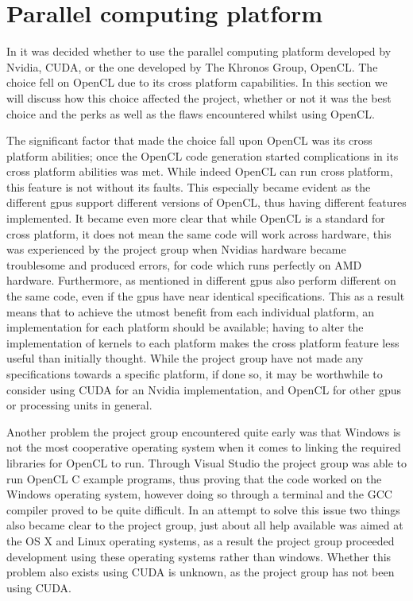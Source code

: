 \section{Parallel computing platform}
In  it was decided whether to use the parallel computing platform developed by Nvidia, CUDA, or the one developed by The Khronos Group, OpenCL.
The choice fell on OpenCL due to its cross platform capabilities.
In this section we will discuss how this choice affected the project, whether or not it was the best choice and the perks as well as the flaws encountered whilst using OpenCL.

The significant factor that made the choice fall upon OpenCL was its cross platform abilities; once the OpenCL code generation started complications in its cross platform abilities was met.
While indeed OpenCL can run cross platform, this feature is not without its faults.
This especially became evident as the different \acrshort{gpu}s support different versions of OpenCL, thus having different features implemented.
It became even more clear that while OpenCL is a standard for cross platform, it does not mean the same code will work across hardware, this was experienced by the project group when Nvidias hardware became troublesome and produced errors, for code which runs perfectly on AMD hardware.
Furthermore, as mentioned in  different \acrshort{gpu}s also perform different on the same code, even if the \acrshort{gpu}s have near identical specifications.
This as a result means that to achieve the utmost benefit from each individual platform, an implementation for each platform should be available; having to alter the implementation of kernels to each platform makes the cross platform feature less useful than initially thought.
While the project group have not made any specifications towards a specific platform, if done so, it may be worthwhile to consider using CUDA for an Nvidia implementation, and OpenCL for other \acrshort{gpu}s or processing units in general.

Another problem the project group encountered quite early was that Windows is not the most cooperative operating system when it comes to linking the required libraries for OpenCL to run.
Through Visual Studio the project group was able to run OpenCL C example programs, thus proving that the code worked on the Windows operating system, however doing so through a terminal and the GCC compiler proved to be quite difficult.
In an attempt to solve this issue two things also became clear to the project group, just about all help available was aimed at the OS X and Linux operating systems, as a result the project group proceeded development using these operating systems rather than windows.
Whether this problem also exists using CUDA is unknown, as the project group has not been using CUDA.
%

